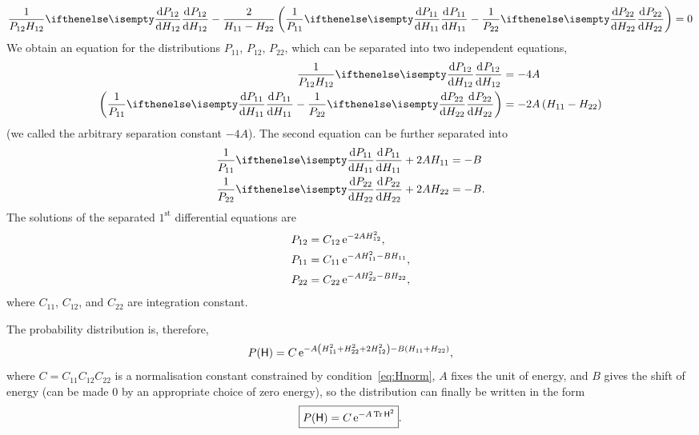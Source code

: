 \documentclass[a4paper,11pt,twoside]{article}
\begin{document}
            \begin{equation}
                \frac{1}{P_{12}H_{12}}\derivative{P_{12}}{H_{12}}-\frac{2}{H_{11}-H_{22}}
                \left(\frac{1}{P_{11}}\derivative{P_{11}}{H_{11}}-\frac{1}{P_{22}}\derivative{P_{22}}{H_{22}}\right)=0
            \end{equation}
            We obtain an equation for the distributions $P_{11}$, $P_{12}$, $P_{22}$, which can be separated into two independent equations,
            \begin{align}
                \frac{1}{P_{12}H_{12}}\derivative{P_{12}}{H_{12}}
                    &=-4A\nonumber\\
                \left(\frac{1}{P_{11}}\derivative{P_{11}}{H_{11}}-\frac{1}{P_{22}}\derivative{P_{22}}{H_{22}}\right)
                    &=-2A\left(H_{11}-H_{22}\right)
            \end{align}
            (we called the arbitrary separation constant $-4A$).
            The second equation can be further separated into
            \begin{align}
                \frac{1}{P_{11}}\derivative{P_{11}}{H_{11}}+2AH_{11}&=-B\nonumber\\
                \frac{1}{P_{22}}\derivative{P_{22}}{H_{22}}+2AH_{22}&=-B.
            \end{align}
            The solutions of the separated $1^{\text{st}}$ differential equations are
            \begin{align}
                P_{12}&=C_{12}\operatorname{e}^{-2AH_{12}^{2}},\nonumber\\
                P_{11}&=C_{11}\operatorname{e}^{-AH_{11}^{2}-BH_{11}},\\
                P_{22}&=C_{22}\operatorname{e}^{-AH_{22}^{2}-BH_{22}},
            \end{align}
            where $C_{11}$, $C_{12}$, and $C_{22}$ are integration constant.

            The probability distribution is, therefore,
            \begin{equation}
                \label{eq:PHelements}
                P(\mathsf{H})=C\operatorname{e}^{-A\left(H_{11}^{2}+H_{22}^{2}+2H_{12}^{2}\right)-B\left(H_{11}+H_{22}\right)},
            \end{equation}
            where $C=C_{11}C_{12}C_{22}$ is a normalisation constant constrained by condition~\eqref{eq:Hnorm}, $A$ fixes the unit of energy, and $B$ gives the shift of energy (can be made $0$ by an appropriate choice of zero energy), so the distribution can finally be written in the form
            \begin{equation}
                \label{eq:PH}
                \boxed{P(\mathsf{H})=C\operatorname{e}^{-A\operatorname{Tr}\mathsf{H}^{2}}}.
            \end{equation}
\end{document}
